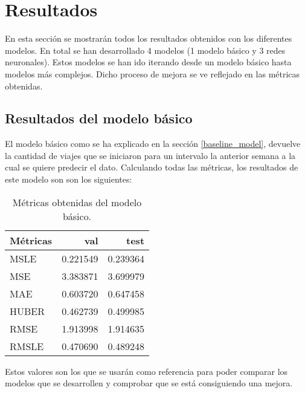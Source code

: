 \section{Resultados}\label{results}

En esta sección se mostrarán todos los resultados obtenidos con los diferentes modelos. En total se han desarrollado 4 modelos (1 modelo básico y 3 redes neuronales). Estos modelos se han ido iterando desde un modelo básico hasta modelos más complejos. Dicho proceso de mejora se ve reflejado en las métricas obtenidas.




\subsection{Resultados del modelo básico}
El modelo básico como se ha explicado en la sección \ref{baseline_model}, devuelve la cantidad de viajes que se iniciaron para un intervalo la anterior semana a la cual se quiere predecir el dato. Calculando todas las métricas, los resultados de este modelo son son los siguientes:

\begin{table}[H]
    \centering
    \begin{tabular}{l|rr}
    \toprule
    Métricas &      val &      test \\
    \midrule
    MSLE &  0.221549 &  0.239364 \\
    MSE &  3.383871 &  3.699979 \\
    MAE &  0.603720 &  0.647458 \\
    HUBER &  0.462739 &  0.499985 \\
    RMSE &  1.913998 &  1.914635 \\
    RMSLE &  0.470690 &  0.489248 \\
    \bottomrule
    \end{tabular}
    \caption{Métricas obtenidas del modelo básico.}
\end{table}

Estos valores son los que se usarán como referencia para poder comparar los modelos que se desarrollen y comprobar que se está consiguiendo una mejora.




